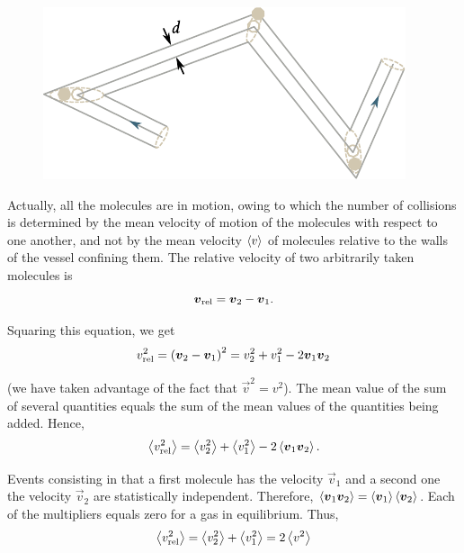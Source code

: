 \begin{figure}[t]
	\begin{center}
		\includegraphics[scale=1]{figures/ch_16/fig_16_5.pdf}
		\caption[]{}
		\label{fig:16_5}
	\end{center}
	\vspace{-0.8cm}
\end{figure}

Actually, all the molecules are in motion, owing to which the number of collisions is determined by the mean velocity of motion of the molecules with respect to one another, and not by the mean velocity $\left\langle v \right\rangle$ of molecules relative to the walls of the vessel confining them. The relative velocity of two arbitrarily taken molecules is
\vspace{-12pt}
\begin{equation*}
    \boldsymbol{v}_{\text{rel}} = \boldsymbol{v}_2 - \boldsymbol{v}_1.
\end{equation*}

\noindent
Squaring this equation, we get
\begin{equation*}
    v_{\text{rel}}^2 = \left(\boldsymbol{v}_2 - \boldsymbol{v}_1\right)^2 = v_2^2 + v_1^2 - 2\boldsymbol{v}_1\boldsymbol{v}_2
\end{equation*}

\noindent
(we have taken advantage of the fact that $\vec{v}^2=v^2$). The mean value of the sum of several quantities equals the sum of the mean values of the quantities being added. Hence,
\begin{equation*}
    \left\langle v_{\text{rel}}^2 \right\rangle = \left\langle v_2^2 \right\rangle + \left\langle v_1^2 \right\rangle - 2\left\langle \boldsymbol{v}_1\boldsymbol{v}_2 \right\rangle.
\end{equation*}

\noindent
Events consisting in that a first molecule has the velocity $\vec{v}_1$ and a second one the velocity $\vec{v}_2$ are statistically independent. Therefore, $\left\langle \boldsymbol{v}_1\boldsymbol{v}_2 \right\rangle=\left\langle \boldsymbol{v}_1 \right\rangle\left\langle \boldsymbol{v}_2 \right\rangle$. Each of the multipliers equals zero for a gas in equilibrium. Thus,
\begin{equation*}
    \left\langle v_{\text{rel}}^2 \right\rangle = \left\langle v_2^2 \right\rangle + \left\langle v_1^2 \right\rangle = 2\left\langle v^2 \right\rangle
\end{equation*}

